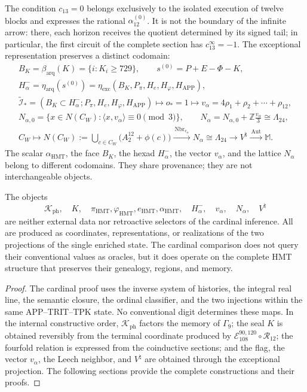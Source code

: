 The condition \(c_{13}=0\) belongs exclusively to the isolated execution of
twelve blocks and expresses the rational \(\alpha_{12}^{(0)}\). It is not
the boundary of the infinite arrow: there, each horizon receives the quotient
determined by its signed tail; in particular, the first circuit of the complete
section has \(c_{13}^{\infty}=-1\). The exceptional representation preserves a
distinct codomain:
\[
 \begin{gathered}
 B_K=\beta_{\mathrm{arq}}(K)=\{i:K_i\ge729\},\qquad
 s^{(0)}=P+E-\Phi-K,\\
 H^-_\alpha=\eta_{\mathrm{arq}}(s^{(0)})
 =\eta_{\mathrm{exc}}(B_K,P_\pi,H_e,H_\varphi,H_{\mathrm{APP}}),\\
 \widetilde{\mathcal I}_*
 =(B_K\subset H^-_\alpha;P_\pi,H_e,H_\varphi,H_{\mathrm{APP}})
 \longmapsto o_*=1
 \longmapsto v_\alpha=4\rho_1+\rho_2+\cdots+\rho_{12},\\
 N_{\alpha,0}
 =\{x\in N(C_W):\langle x,v_\alpha\rangle\equiv0\pmod3\},\qquad
 N_\alpha=N_{\alpha,0}+\mathbb Z\frac{v_\alpha}{3}\cong\Lambda_{24},\\
 C_W\longmapsto
 N(C_W):=\bigcup_{c\in C_W}\bigl(A_2^{12}+\phi(c)\bigr)
 \xrightarrow{\ \operatorname{Nbr}_{v_\alpha}\ }
 N_\alpha\cong\Lambda_{24}
 \longrightarrow V^\natural
 \xrightarrow{\ \operatorname{Aut}\ }\mathbb M.
 \end{gathered}
\]
The scalar \(\alpha_{\mathrm{HMT}}\), the face \(B_K\), the hexad
\(H^-_\alpha\), the vector \(v_\alpha\), and the lattice \(N_\alpha\)
belong to different codomains. They share provenance; they are not
interchangeable objects.

\begin{proposition}
\label{prop:posterioridad-testigos-ch}
The objects
\[
 \mathcal K_{\mathrm{ph}},\quad K,\quad
 \pi_{\mathrm{HMT}},\varphi_{\mathrm{HMT}},e_{\mathrm{HMT}},
 \alpha_{\mathrm{HMT}},\quad H^-_\alpha,\quad v_\alpha,\quad
 N_\alpha,\quad V^\natural
\]
are neither external data nor retroactive selectors of the cardinal inference.
All are produced as coordinates, representations, or realizations of the two
projections of the single enriched state. The cardinal comparison does not
query their conventional values as oracles, but it does operate on the
complete HMT structure that preserves their genealogy, regions, and memory.
\end{proposition}

\begin{proof}
The cardinal proof uses the inverse system of histories, the integral real
line, the semantic closure, the ordinal classifier, and the two injections
within the same APP--TRIT--TPK state. No conventional digit determines these
maps. In the internal constructive order, \(\mathcal K_{\mathrm{ph}}\)
factors the memory of \(\Gamma_9\); the seal \(K\) is obtained reversibly
from the terminal coordinate produced by
\(\mathcal E_{108}^{90,120}\circ\mathcal R_{12}\); the fourfold relation
is expressed from the coinductive sections; and the flag, the vector
\(v_\alpha\), the Leech neighbor, and \(V^\natural\) are obtained through
the exceptional projection. The following sections provide the complete
constructions and their proofs.
\end{proof}

